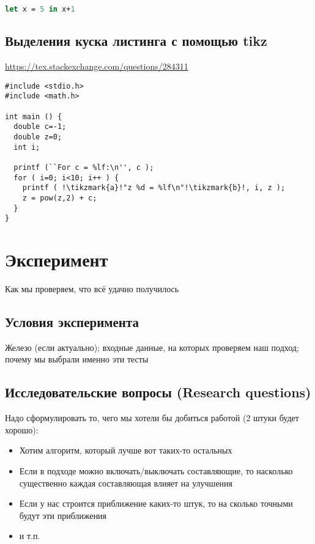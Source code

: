 \begin{lstlisting}[caption=Название, language=Caml, frame=single]
let x = 5 in x+1
\end{lstlisting}

\subsection{Выделения куска листинга с помощью tikz}
\url{https://tex.stackexchange.com/questions/284311}

\begin{lstlisting}[escapechar=!,basicstyle=\ttfamily]
#include <stdio.h>
#include <math.h>

int main () {
  double c=-1;
  double z=0;
  int i;

  printf (``For c = %lf:\n'', c );
  for ( i=0; i<10; i++ ) {
    printf ( !\tikzmark{a}!"z %d = %lf\n"!\tikzmark{b}!, i, z );
    z = pow(z,2) + c;
  }
}
\end{lstlisting}



\section{Эксперимент}
Как мы проверяем, что  всё удачно получилось

\subsection{Условия эксперимента}
Железо (если актуально); входные данные, на которых проверяем наш подход; почему мы выбрали именно эти тесты

\subsection{Исследовательские вопросы (Research questions)}
Надо сформулировать то, чего мы хотели бы добиться работой (2 штуки будет хорошо):

\begin{itemize}
\item Хотим алгоритм, который лучше вот таких-то остальных
\item Если в подходе можно включать/выключать составляющие, то насколько существенно каждая составляющая влияет на улучшения
\item Если у нас строится приближение каких-то штук, то на сколько точными будут эти приближения
\item и т.п.
\end{itemize}

